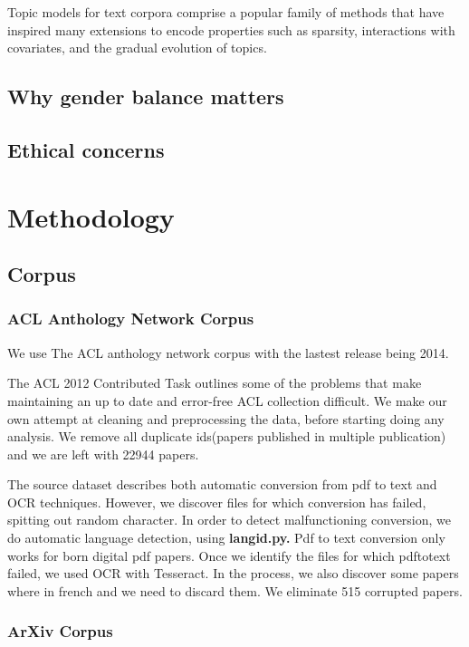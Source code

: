 \documentclass[bsc,frontabs,twoside,singlespacing,parskip,deptreport]{infthesis}     %
\begin{document}
Topic models for text corpora comprise a popular family of methods that have inspired many extensions to encode properties such as sparsity, interactions with covariates, and the gradual evolution of topics.

\section{Why gender balance matters}

\section{Ethical concerns}

\chapter{Methodology}

\section{Corpus}
\subsection{ACL Anthology Network Corpus}
We use The ACL anthology network corpus \cite{aan} with the lastest release being 2014. 

The  ACL 2012 Contributed Task \cite{contributed} outlines some of the problems that make maintaining an up to date and error-free ACL collection difficult. We make our own attempt at cleaning and preprocessing the data, before starting doing any analysis.
We remove all duplicate ids(papers published in multiple publication) and we are left with 22944 papers. 

The source dataset describes both automatic conversion from pdf to text and OCR techniques. However, we discover files for which conversion has failed, spitting out random character.
In order to detect malfunctioning conversion, we do automatic language detection, using \textbf{langid.py.} \cite{langid}
Pdf to text conversion only works for born digital pdf papers. Once we identify the files for which pdftotext failed, we used OCR with Tesseract. In the process, we also discover some papers where in french and we need to discard them. We eliminate 515 corrupted papers.
\subsection{ArXiv Corpus}
\end{document}
